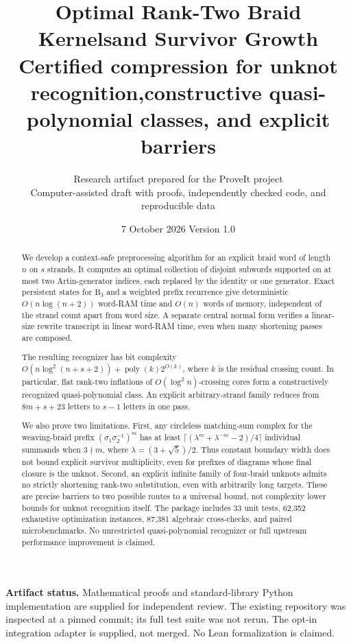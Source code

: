 \documentclass[11pt]{article}
\title{\textbf{Optimal Rank-Two Braid Kernels\newline and Survivor Growth}\\[6pt]
\large Certified compression for unknot recognition,\newline constructive quasi-polynomial classes, and explicit barriers}
\author{Research artifact prepared for the ProveIt project\\
\small Computer-assisted draft with proofs, independently checked code, and reproducible data}
\date{7 October 2026 \quad\textbar\quad Version 1.0}
\theoremstyle{definition}
\theoremstyle{remark}
\newcommand{\B}{\mathrm B}
\newcommand{\poly}{\operatorname{poly}}
\begin{document}
\maketitle
\thispagestyle{empty}
\begin{abstract}
We develop a context-safe preprocessing algorithm for an explicit braid word of
length $n$ on $s$ strands. It computes an optimal collection of disjoint subwords
supported on at most two Artin-generator indices, each replaced by the identity
or one generator. Exact persistent states for $\B_3$ and a weighted prefix
recurrence give deterministic $O(n\log(n+2))$ word-RAM time and $O(n)$ words of
memory, independent of the strand count apart from word size. A separate central
normal form verifies a linear-size rewrite transcript in linear word-RAM time,
even when many shortening passes are composed.

The resulting recognizer has bit complexity
$O(n\log^2(n+s+2))+\poly(k)2^{O(k)}$, where $k$ is the residual crossing count.
In particular, flat rank-two inflations of $O(\log^2 n)$-crossing cores form a
constructively recognized quasi-polynomial class. An explicit arbitrary-strand
family reduces from $8m+s+23$ letters to $s-1$ letters in one pass.

We also prove two limitations. First, any circleless matching-sum complex for
the weaving-braid prefix $(\sigma_1\sigma_2^{-1})^m$ has at least
$\lceil(\lambda^m+\lambda^{-m}-2)/4\rceil$ individual summands when $3\nmid m$,
where $\lambda=(3+\sqrt5)/2$. Thus constant boundary width does not bound explicit
survivor multiplicity, even for prefixes of diagrams whose final closure is the
unknot. Second, an explicit infinite family of four-braid unknots admits no
strictly shortening rank-two substitution, even with arbitrarily long targets.
These are precise barriers to two possible routes to a universal bound, not
complexity lower bounds for unknot recognition itself. The package includes
33 unit tests, 62,352 exhaustive optimization instances, 87,381 algebraic
cross-checks, and paired microbenchmarks. No unrestricted quasi-polynomial
recognizer or full upstream performance improvement is claimed.
\end{abstract}
\vfill
\noindent\textbf{Artifact status.} Mathematical proofs and standard-library Python
implementation are supplied for independent review. The existing repository was
inspected at a pinned commit; its full test suite was not rerun. The opt-in
integration adapter is supplied, not merged. No Lean formalization is claimed.
\clearpage
\tableofcontents
\clearpage
\end{document}
